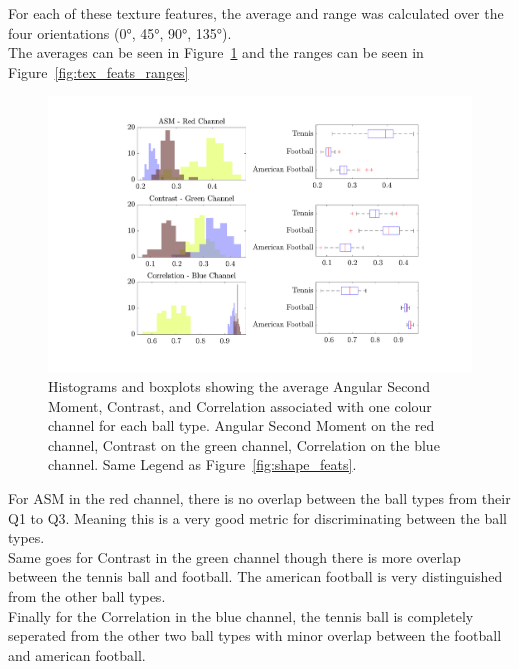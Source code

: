 \documentclass[conference]{IEEEtran}
\begin{document}
        For each of these texture features, the average and range was calculated over the four orientations 
        (\ang{0}, \ang{45}, \ang{90}, \ang{135}).\\
        The averages can be seen in Figure~\ref{fig:tex_feats_avgs} and the ranges can be seen in Figure~\ref{fig:tex_feats_ranges}

        \begin{figure}[htbp]
            \centering
            \captionsetup{singlelinecheck=off}
            \includegraphics[width=\columnwidth]{figures/averages.pdf}
            \caption[]{Histograms and boxplots showing the average Angular Second Moment, Contrast, and Correlation associated with one colour channel for each ball type.
                Angular Second Moment on the red channel,
                Contrast on the green channel,
                Correlation on the blue channel. Same Legend as Figure~\ref{fig:shape_feats}.~\label{fig:tex_feats_avgs}
            }
        \end{figure}

        For ASM in the red channel, there is no overlap between the ball types from their Q1 to Q3. Meaning this is a very good metric for 
        discriminating between the ball types.\\
        Same goes for Contrast in the green channel though there is more overlap between the tennis ball and football. The american football
        is very distinguished from the other ball types.\\
        Finally for the Correlation in the blue channel, the tennis ball is completely seperated from the other two ball types with minor
        overlap between the football and american football.
\end{document}
